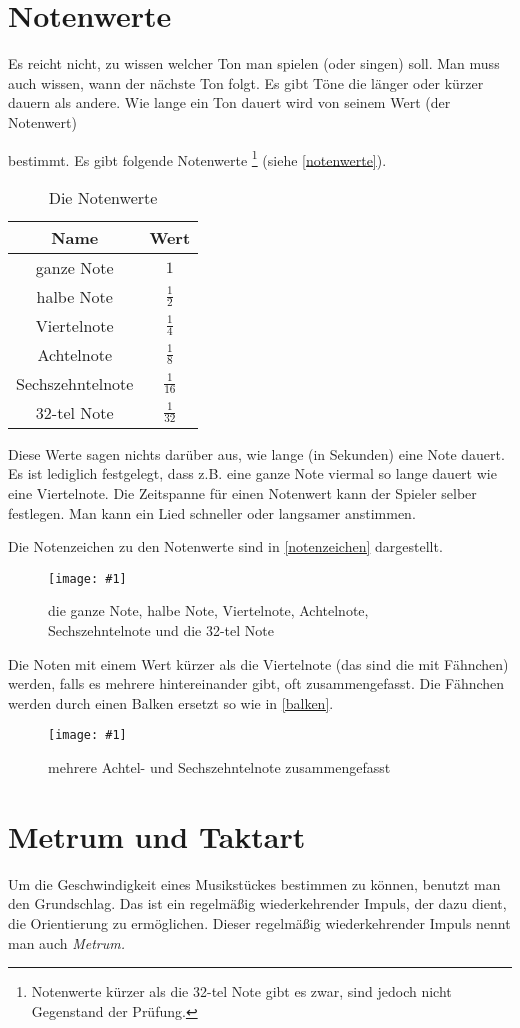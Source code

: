 \documentclass[10pt,a4paper,twoside]{report}
\newcommand{\comment}[1]{
	\marginpar{
		\textsf{#1}
	}
}
\newcommand{\image}[4]{
	\begin{figure}[!ht]
		\centering
		\texttt{[image: \#1]}
		\caption{#2}
		\label{#3}
	\end{figure}
}
\begin{document}
\section{Notenwerte}
Es reicht nicht, zu wissen welcher Ton man spielen (oder singen) soll. Man
muss auch wissen, wann der nächste Ton folgt. Es gibt Töne die länger oder kürzer
dauern als andere. Wie lange ein Ton dauert 
wird von seinem Wert (der Notenwert)\comment{Notenwert $\rightarrow$ Dauer}
bestimmt. Es gibt folgende Notenwerte%
\footnote{Notenwerte 
kürzer als die 32-tel Note gibt es zwar, sind jedoch 
nicht Gegenstand der Prüfung.}
(siehe \autoref{notenwerte}).
\begin{table}[!ht]
	\centering
	\begin{tabular}{|c|c|}
	\hline \textbf{Name} & \textbf{Wert} \\
	\hline ganze Note & $1$ \\ 
	\hline halbe Note & $\frac{1}{2}$ \\ 
	\hline Viertelnote & $\frac{1}{4}$ \\ 
	\hline Achtelnote & $ \frac{1}{8} $ \\ 
	\hline Sechszehntelnote & $ \frac{1}{16} $ \\ 
	\hline 32-tel Note & $ \frac{1}{32} $ \\ 
	\hline 
	\end{tabular} 
	\caption{Die Notenwerte}
	\label{notenwerte}
\end{table}
Diese Werte sagen nichts darüber aus, wie lange (in Sekunden) eine Note dauert. 
Es ist lediglich festgelegt, dass z.B. eine ganze Note 
viermal so lange dauert wie eine
Viertelnote. Die Zeitspanne für einen Notenwert kann der Spieler selber 
festlegen. Man kann ein Lied schneller oder langsamer anstimmen.

Die Notenzeichen zu den Notenwerte sind in \autoref{notenzeichen} dargestellt.%
\image{lilypond/notenwerte.png}{die ganze Note, halbe Note, Viertelnote,
Achtelnote, Sechszehntelnote und die 32-tel Note}{notenzeichen}{8}
Die Noten mit einem Wert kürzer als die Viertelnote (das sind die mit Fähnchen) 
werden, falls es mehrere hintereinander gibt, oft zusammengefasst. 
Die Fähnchen werden 
durch einen Balken ersetzt so wie in \autoref{balken}.
\image{lilypond/balken.png}{mehrere Achtel- und Sechszehntelnote zusammengefasst}{balken}{6.5}

\section{Metrum und Taktart}
Um die Geschwindigkeit eines Musikstückes bestimmen zu können, benutzt man
den Grundschlag. Das ist ein regelmäßig wiederkehrender Impuls, der dazu dient,
die Orientierung zu ermöglichen. \comment{Metrum}Dieser regelmäßig 
wiederkehrender Impuls nennt man auch \emph{Metrum.}
\end{document}
